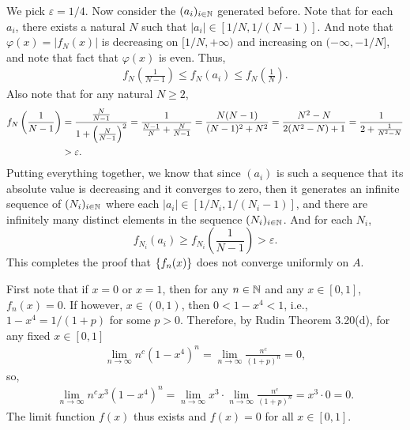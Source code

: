 \documentclass[12pt]{article}
\begin{document}
\begin{fproof}[1(b)]
    We pick \(\varepsilon = 1/4\). Now consider the \((a_i)_{i \in \mathbb {N}}\) generated before. Note that for each \(a_i\), there exists a natural \(N\) such that \(|a_i| \in [1/N, 1/(N-1)]\).
    And note that \(\varphi(x)= |f_N(x)|\) is decreasing on \([1/N, +\infty)\) and increasing on \((-\infty, -1/N]\), and note that fact that \(\varphi(x)\) is even.
    Thus,
    \begin{align*}
        f_N\left(\frac{1}{N-1}\right) \leq f_N(a_i) \leq f_N\left(\frac{1}{N}\right).
    \end{align*}
    Also note that for any natural \(N\geq 2\),
    \begin{align*}
        f_N \left( \frac{1}{N-1} \right) &= \frac{\frac{N}{N-1}}{1 + \left( \frac{N}{N-1} \right)^2} = \frac{1}{\frac{N-1}{N} + \frac{N}{N-1}} = \frac{N(N-1)}{(N-1)^2 + N^2} = \frac{N^2 - N}{2(N^2 - N) + 1} = \frac{1}{2 + \frac{1}{N^2-N}} \\
        &> \varepsilon.
    \end{align*}
    Putting everything together, we know that since \((a_i)\) is such a sequence that its absolute value is decreasing and it converges to zero, then it generates an infinite sequence of \((N_i)_{i\in \mathbb {N}}\) where each \(|a_i| \in [1/N_i, 1/(N_i-1)]\), and there are infinitely many distinct elements in the sequence \((N_i)_{i \in \mathbb {N}}\).
    And for each \(N_i\), \[f_{N_i}(a_i) \geq f_{N_i}\left(\frac{1}{N-1}\right) > \varepsilon.\]
    This completes the proof that \(\left\{ f_n(x) \right\}\) does not converge uniformly on \(A\).

\end{fproof}
\newpage

\begin{fproof}[2(a)]
    First note that if \(x = 0\) or \(x = 1\), then for any \(n \in \mathbb {N}\) and any \(x \in [0,1]\), \(f_n(x) = 0\).
    If however, \(x \in (0,1)\), then \(0< 1 - x^4 < 1\), i.e., \(1-x^4 = 1/(1+p)\) for some \(p > 0\).
    Therefore, by Rudin Theorem 3.20(d), for any fixed \(x \in [0,1]\)
    \begin{align*}
        \lim_{n\to\infty} n^c(1-x^4)^n = \lim_{n\to\infty} \frac{n^c}{(1+p)^n} = 0,
    \end{align*}
    so,
    \begin{align*}
        \lim_{n\to\infty}n^cx^3(1-x^4)^n = \lim_{n\to\infty} x^3 \cdot \lim_{n\to\infty} \frac{n^c}{(1+p)^n} = x^3 \cdot 0 = 0.
    \end{align*}
    The limit function \(f(x)\) thus exists and \(f(x) = 0\) for all \(x \in [0,1].\)
\end{fproof}
\end{document}
